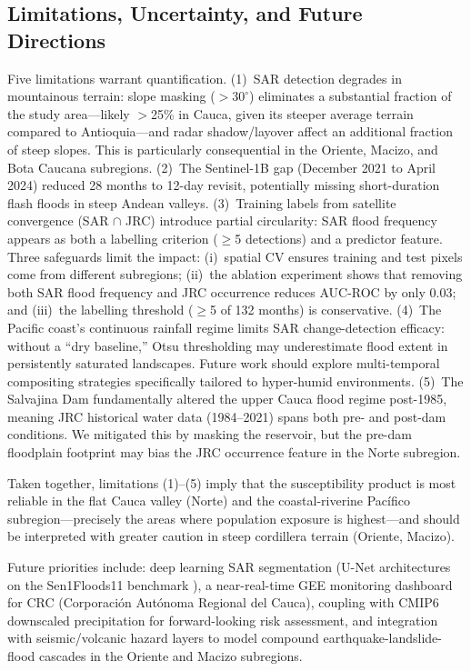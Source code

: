 \documentclass{article}
\begin{document}
\subsection{Limitations, Uncertainty, and Future Directions}
\label{sec:limitations}

Five limitations warrant quantification. (1)~SAR detection degrades in mountainous terrain: slope masking ($>30^{\circ}$) eliminates a substantial fraction of the study area---likely $>$25\% in Cauca, given its steeper average terrain compared to Antioquia---and radar shadow/layover affect an additional fraction of steep slopes. This is particularly consequential in the Oriente, Macizo, and Bota Caucana subregions. (2)~The Sentinel-1B gap (December 2021 to April 2024) reduced 28 months to 12-day revisit, potentially missing short-duration flash floods in steep Andean valleys. (3)~Training labels from satellite convergence (SAR $\cap$ JRC) introduce partial circularity: SAR flood frequency appears as both a labelling criterion ($\geq$5 detections) and a predictor feature. Three safeguards limit the impact: (i)~spatial CV ensures training and test pixels come from different subregions; (ii)~the ablation experiment shows that removing both SAR flood frequency and JRC occurrence reduces AUC-ROC by only 0.03; and (iii)~the labelling threshold ($\geq$5 of 132 months) is conservative. (4)~The Pacific coast's continuous rainfall regime limits SAR change-detection efficacy: without a ``dry baseline,'' Otsu thresholding may underestimate flood extent in persistently saturated landscapes. Future work should explore multi-temporal compositing strategies specifically tailored to hyper-humid environments. (5)~The Salvajina Dam fundamentally altered the upper Cauca flood regime post-1985, meaning JRC historical water data (1984--2021) spans both pre- and post-dam conditions. We mitigated this by masking the reservoir, but the pre-dam floodplain footprint may bias the JRC occurrence feature in the Norte subregion.

Taken together, limitations (1)--(5) imply that the susceptibility product is most reliable in the flat Cauca valley (Norte) and the coastal-riverine Pac\'ifico subregion---precisely the areas where population exposure is highest---and should be interpreted with greater caution in steep cordillera terrain (Oriente, Macizo).

Future priorities include: deep learning SAR segmentation (U-Net architectures on the Sen1Floods11 benchmark \citep{Bonafilia2020}), a near-real-time GEE monitoring dashboard for CRC (Corporaci\'on Aut\'onoma Regional del Cauca), coupling with CMIP6 downscaled precipitation for forward-looking risk assessment, and integration with seismic/volcanic hazard layers to model compound earthquake-landslide-flood cascades in the Oriente and Macizo subregions.
\end{document}
